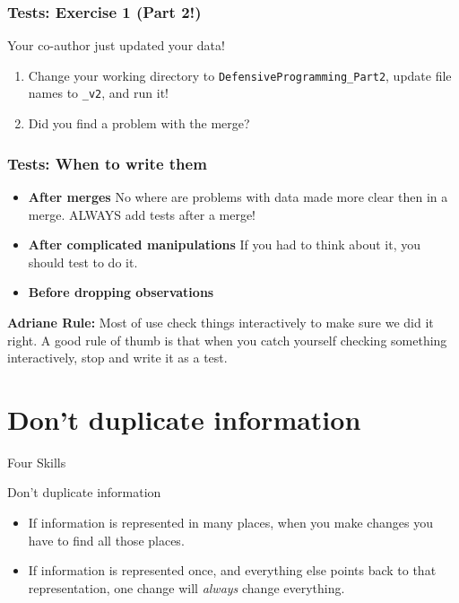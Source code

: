 \documentclass[11pt]{beamer}
\begin{document}
\begin{frame}\frametitle{Tests: Exercise 1 (Part 2!)}
Your co-author just updated your data!

\begin{enumerate}
    \item Change your working directory to \texttt{DefensiveProgramming\_Part2}, update file names to \texttt{\_v2}, and run it!
    \item Did you find a problem with the merge?
\end{enumerate}

\end{frame}

\begin{frame}\frametitle{Tests: When to write them}

\begin{itemize}
    \pause \item \textbf{After merges} No where are problems with data made more clear then in a merge. ALWAYS add tests after a merge!
    \pause \item \textbf{After complicated manipulations} If you had to think about it, you should test to do it.
    \pause \item \textbf{Before dropping observations}
\end{itemize}

\vspace{1cm}
\pause \textbf{Adriane Rule:} Most of use check things interactively to make sure we did it right. A good rule of thumb is that when you catch yourself checking something interactively, stop and write it as a test.

\end{frame}


\section{Don't duplicate information}


\begin{frame}[c]{Four Skills}
    \tableofcontents[currentsection]
\end{frame}


\begin{frame}[fragile]{Don't duplicate information}

\begin{itemize}
    \pause \item If information is represented in many places, when you make changes you have to find all those places.
    \pause \item If information is represented once, and everything else points back to that representation, one change will \emph{always} change everything.
\end{itemize}

\end{frame}
\end{document}
